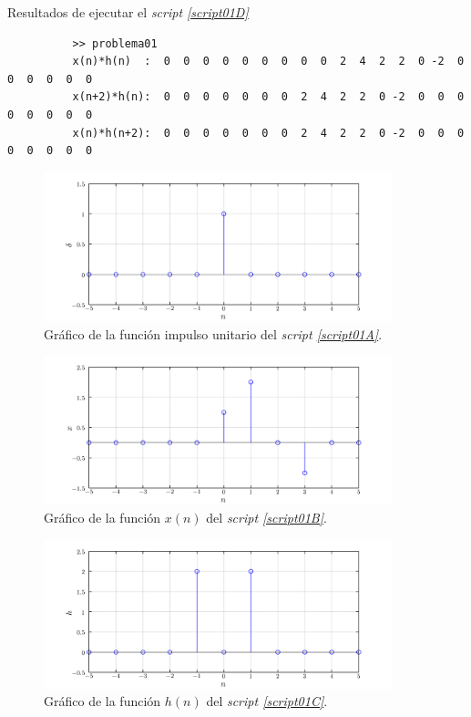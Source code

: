 \documentclass[a4paper,12pt,final]{article}
\begin{document}
      \begin{listing}[H]
        \caption{Resultados de ejecutar el \emph{script \ref{script01D}}}
        \label{script01E}
        \begin{verbatim}
          >> problema01
          x(n)*h(n)  :  0  0  0  0  0  0  0  0  0  2  4  2  2  0 -2  0  0  0  0  0  0
          x(n+2)*h(n):  0  0  0  0  0  0  0  2  4  2  2  0 -2  0  0  0  0  0  0  0  0
          x(n)*h(n+2):  0  0  0  0  0  0  0  2  4  2  2  0 -2  0  0  0  0  0  0  0  0
        \end{verbatim}
      \end{listing}

      \begin{figure}[H]
        \caption{Gráfico de la función impulso unitario del \emph{script \ref{script01A}}.}
        \label{script01Afigure}
        \includegraphics[width=0.90\textwidth]{./laboratorio_3/problema01_impulso.png}
      \end{figure}

      \begin{figure}[H]
        \caption{Gráfico de la función $x\left(n\right)$ del \emph{script \ref{script01B}}.}
        \label{script01Bfigure}
        \includegraphics[width=0.90\textwidth]{./laboratorio_3/problema01_x.png}
      \end{figure}

      \begin{figure}[H]
        \caption{Gráfico de la función $h\left(n\right)$ del \emph{script \ref{script01C}}.}
        \label{script01Cfigure}
        \includegraphics[width=0.90\textwidth]{./laboratorio_3/problema01_h.png}
      \end{figure}
\end{document}
